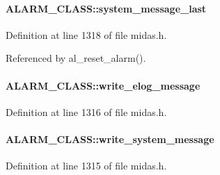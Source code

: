\paragraph[{system\_\-message\_\-last}]{ {\bf ALARM\_\-CLASS::system\_\-message\_\-last}}\hfill\label{structALARM__CLASS_a253493c45cc07415341e19352a1b7ce3}


Definition at line 1318 of file midas.h.

Referenced by al\_\-reset\_\-alarm().
\paragraph[{write\_\-elog\_\-message}]{ {\bf ALARM\_\-CLASS::write\_\-elog\_\-message}}\hfill\label{structALARM__CLASS_ad76276faeef73caacdb0ab06815bfa40}


Definition at line 1316 of file midas.h.
\paragraph[{write\_\-system\_\-message}]{ {\bf ALARM\_\-CLASS::write\_\-system\_\-message}}\hfill\label{structALARM__CLASS_a0a3ec68d2f1343357fcc3a9d04a87017}


Definition at line 1315 of file midas.h.